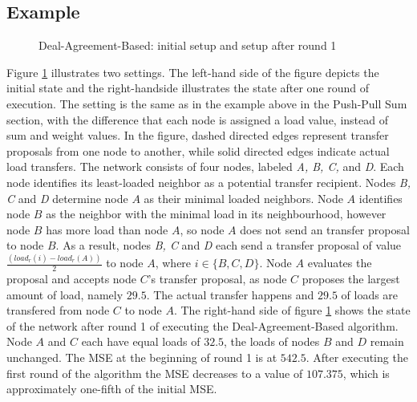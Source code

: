 \subsection{Example}\label{subsec:exampleDAB}
 \begin{figure}
    \centering
    \scalebox{0.75}{}
    \caption{Deal-Agreement-Based: initial setup and setup after round 1}
    \label{fig:DABExampleAlgo}
 \end{figure}
Figure \ref{fig:DABExampleAlgo} illustrates two settings. The left-hand side of the figure depicts the initial state and the right-handside illustrates the state after one round of execution. The setting is the same as in the example above in the Push-Pull Sum section, with the difference that each node is assigned a load value, instead of sum and weight values. In the figure, dashed directed edges represent transfer proposals from one node to another, while solid directed edges indicate actual load transfers. The network consists of four nodes, labeled \textit{A, B, C,} and \textit{D}. Each node identifies its least-loaded neighbor as a potential transfer recipient. Nodes \textit{B, C} and \textit{D} determine node $A$ as their minimal loaded neighbors. Node $A$ identifies node $B$ as the neighbor with the minimal load in its neighbourhood, however node $B$ has more load than node $A$, so node $A$ does not send an transfer proposal to node $B$. As a result, nodes \textit{B, C} and \textit{D} each send a transfer proposal of value $\frac{(load_r(i)-load_r(A))}{2}$ to node $A$, where $i \in \{B,C,D\}$. Node $A$ evaluates the proposal and accepts node $C$'s transfer proposal, as node $C$ proposes the largest amount of load, namely $29.5$. The actual transfer happens and $29.5$ of loads are transfered from node $C$ to node $A$. The right-hand side of figure \ref{fig:DABExampleAlgo} shows the state of the network after round 1 of executing the Deal-Agreement-Based algorithm. Node $A$ and $C$ each have equal loads of $32.5$, the loads of nodes $B$ and $D$ remain unchanged. The MSE at the beginning of round 1 is at $542.5$. After executing the first round of the algorithm the MSE decreases to a value of $107.375$, which is approximately one-fifth of the initial MSE.

